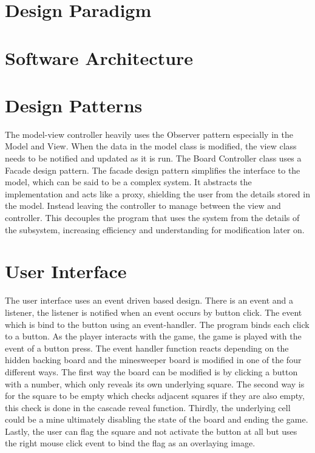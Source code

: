 \documentclass[12pt, a4]{report}
\begin{document}
	\section{Design Paradigm}

	\section{Software Architecture}
	
	\section{Design Patterns}
	\par The model-view controller heavily uses the Observer pattern especially in the Model and View. When the data in the model class is modified, the view class needs to be notified and updated as it is run. 
	The Board Controller class uses a Facade design pattern. The facade design pattern simplifies the interface to the model, which can be said to be a complex system. It abstracts the implementation and acts like a proxy, shielding the user from the details stored in the model. Instead leaving the controller to manage between the view and controller. This decouples the program that uses the system from the details of the subsystem, increasing efficiency and understanding for modification later on. 

	\section{User Interface}
	The user interface uses an event driven based design. There is an event and a listener, the listener is notified when an event occurs by button click. The event which is bind to the button using an event-handler. The program binds each click to a button. As the player interacts with the game, the game is played with the event of a button press. The event handler function reacts depending on the hidden backing board and the minesweeper board is modified in one of the four different ways. The first way the board can be modified is by clicking a button with a number, which only reveals its own underlying square. The second way is for the square to be empty which checks adjacent squares if they are also empty, this check is done in the cascade reveal function. Thirdly, the underlying cell could be a mine ultimately disabling the state of the board and ending the game. Lastly, the user can flag the square and not activate the button at all but uses the right mouse click event to bind the flag as an overlaying image. 
	
\end{document}
